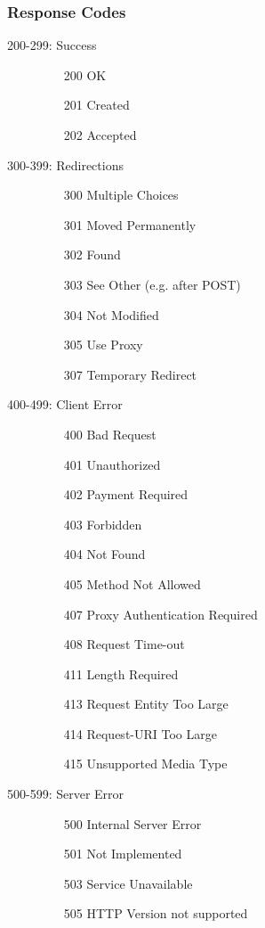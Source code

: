 \documentclass[10pt]{article}
\begin{document}
\subsubsection{Response Codes}
\begin{description}
	\item[200-299: Success] \hfill
	\begin{itemize}
		\item[200] OK
		\item[201] Created
		\item[202] Accepted
	\end{itemize}
	\item[300-399: Redirections] \hfill
	\begin{itemize}
		\item[300] Multiple Choices
		\item[301] Moved Permanently
		\item[302] Found
		\item[303] See Other (e.g. after POST)
		\item[304] Not Modified
		\item[305] Use Proxy
		\item[307] Temporary Redirect
	\end{itemize}
	\item[400-499: Client Error] \hfill
	\begin{itemize}
		\item[400] Bad Request
		\item[401] Unauthorized
		\item[402] Payment Required
		\item[403] Forbidden
		\item[404] Not Found
		\item[405] Method Not Allowed
		\item[407] Proxy Authentication Required
		\item[408] Request Time-out
		\item[411] Length Required
		\item[413] Request Entity Too Large
		\item[414] Request-URI Too Large
		\item[415] Unsupported Media Type
	\end{itemize}
	\item[500-599: Server Error] \hfill
	\begin{itemize}
		\item[500] Internal Server Error
		\item[501] Not Implemented
		\item[503] Service Unavailable
		\item[505] HTTP Version not supported
	\end{itemize}
\end{description}
\end{document}
